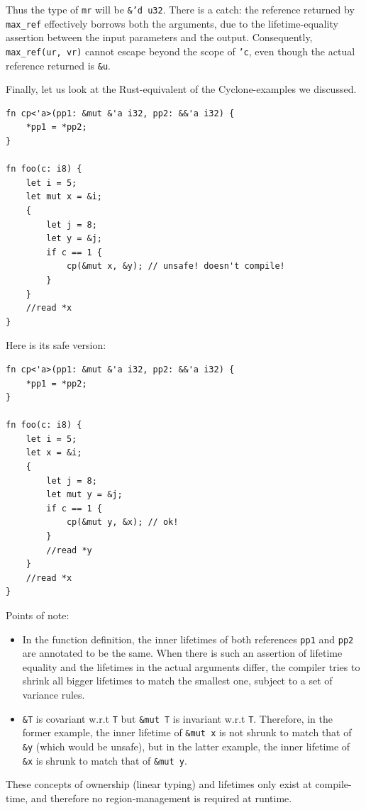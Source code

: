 \documentclass[11pt]{report}
\begin{document}
Thus the type of \texttt{mr} will be \texttt{\&'d u32}. There is a catch: the reference returned by \texttt{max\_ref} effectively borrows both the arguments, due to the lifetime-equality assertion between the input parameters and the output. Consequently, \texttt{max\_ref(ur, vr)} cannot escape beyond the scope of \texttt{'c}, even though the actual reference returned is \texttt{\&u}.

Finally, let us look at the Rust-equivalent of the Cyclone-examples we discussed.

\begin{lstlisting}
fn cp<'a>(pp1: &mut &'a i32, pp2: &&'a i32) {
    *pp1 = *pp2;
}

fn foo(c: i8) {
    let i = 5;
    let mut x = &i;
    {
        let j = 8;
        let y = &j;
        if c == 1 {
            cp(&mut x, &y); // unsafe! doesn't compile!
        }
    }
    //read *x
}
\end{lstlisting}

\noindent Here is its safe version:

\begin{lstlisting}
fn cp<'a>(pp1: &mut &'a i32, pp2: &&'a i32) {
    *pp1 = *pp2;
}

fn foo(c: i8) {
    let i = 5;
    let x = &i;
    {
        let j = 8;
        let mut y = &j;
        if c == 1 {
            cp(&mut y, &x); // ok!
        }
        //read *y
    }
    //read *x
}
\end{lstlisting}

\noindent Points of note:
\begin{itemize}
\item In the function definition, the inner lifetimes of both references \texttt{pp1} and \texttt{pp2} are annotated to be the same. When there is such an assertion of lifetime equality and the lifetimes in the actual arguments differ, the compiler tries to shrink all bigger lifetimes to match the smallest one, subject to a set of variance rules.
\item \texttt{\&T} is covariant w.r.t \texttt{T} but \texttt{\&mut T} is invariant w.r.t \texttt{T}. Therefore, in the former example, the inner lifetime of \texttt{\&mut x} is not shrunk to match that of \texttt{\&y} (which would be unsafe), but in the latter example, the inner lifetime of \texttt{\&x} is shrunk to match that of \texttt{\&mut y}.
\end{itemize}

These concepts of ownership (linear typing) and lifetimes only exist at compile-time, and therefore no region-management is required at runtime.
\end{document}
